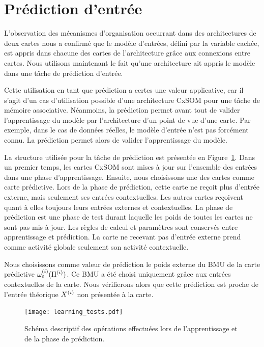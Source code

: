 \documentclass[../main]{subfiles}
\begin{document}
\section{Prédiction d'entrée}

L'observation des mécanismes d'organisation occurrant dans des architectures de deux cartes nous a confirmé que le modèle d'entrées, défini par la variable cachée, est appris dans chacune des cartes de l'architecture grâce aux connexions entre cartes.
Nous utilisons maintenant le fait qu'une architecture ait appris le modèle dans une tâche de prédiction d'entrée.

Cette utilisation en tant que prédiction a certes une valeur applicative, car il s'agit d'un cas d'utilisation possible d'une architecture CxSOM pour une tâche de mémoire associative. Néanmoins, la prédiction permet avant tout de valider l'apprentissage du modèle par l'architecture d'un point de vue d'une carte. Par exemple, dans le cas de données réelles, le modèle d'entrée n'est pas forcément connu. La prédiction permet alors de valider l'apprentissage du modèle.

La structure utilisée pour la tâche de prédiction est présentée en Figure~\ref{fig:schema_pred}. Dans un premier temps, les cartes CxSOM sont mises à jour sur l'ensemble des entrées dans une phase d'apprentissage. Ensuite, nous choisissons une des cartes comme carte prédictive. Lors de la phase de prédiction, cette carte ne reçoit plus d'entrée externe, mais seulement ses entrées contextuelles. 
Les autres cartes reçoivent quant à elles toujours leurs entrées externes et contextuelles. La phase de prédiction est une phase de test durant laquelle les poids de toutes les cartes ne sont pas mis à jour. Les règles de calcul et paramètres sont conservés entre apprentissage et prédiction.
La carte ne recevant pas d'entrée externe prend comme activité globale seulement son activité contextuelle.

Nous choisissons comme valeur de prédiction le poids externe du BMU de la carte prédictive $\omega_{e}^{({i})}(\Pi^{({i})})$. Ce BMU a été choisi uniquement grâce aux entrées contextuelles de la carte. Nous vérifierons alors que cette prédiction est proche de l'entrée théorique $X^{({i})}$ non présentée à la carte.

\begin{figure}
	\texttt{[image: learning\_tests.pdf]}
	\caption{Schéma descriptif des opérations effectuées lors de l'apprentissage et de la phase de prédiction.\label{fig:schema_pred}}
\end{figure}
\end{document}
